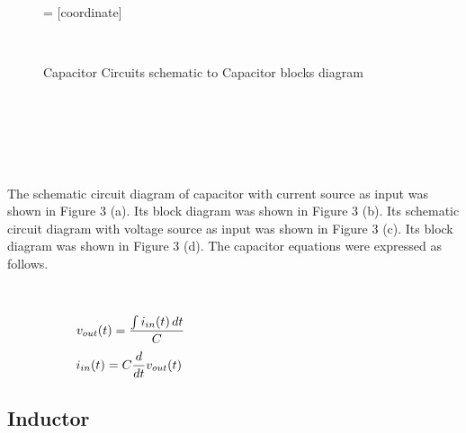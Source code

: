 \documentclass[10pt,a4paper]{article}
\begin{document}
\begin{CJK*}{UTF8}{gbsn}
\begin{figure}[H]
 = [coordinate]                                             
 \par \ \par\noindent \caption{Capacitor Circuits schematic to Capacitor blocks diagram}
    \end{figure}

 \par \ \par\noindent \par \ \par
 \par \ \par\noindent The schematic circuit diagram of capacitor with current source as input     was shown in Figure 3 (a). Its block diagram was shown in Figure 3 (b).     Its schematic circuit diagram with voltage source as input was shown in     Figure 3 (c). Its block diagram was shown in Figure 3 (d). The capacitor     equations were expressed as follows.
 \par \ \par\begin{equation}
 \begin{minipage}{250pt}
                \begin{flushleft} $\displaystyle v_{out}{\left(t \right)} = \frac{\int i_{in}{\left(t \right)}\, dt}{C}$  \end{flushleft}
 \end{minipage}
 \end{equation}
\begin{equation}
 \begin{minipage}{250pt}
                \begin{flushleft} $\displaystyle i_{in}{\left(t \right)} = C \frac{d}{d t} v_{out}{\left(t \right)}$  \end{flushleft}
 \end{minipage}
 \end{equation}
\noindent \subsection{Inductor}
 \par \ \par\noindent \begin{figure}[H] \centering 


\end{figure}
\end{CJK*}
\end{document}
